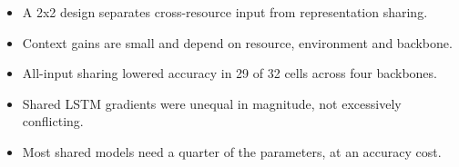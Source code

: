 \begin{itemize}
  \item A 2x2 design separates cross-resource input from representation sharing.
  \item Context gains are small and depend on resource, environment and backbone.
  \item All-input sharing lowered accuracy in 29 of 32 cells across four backbones.
  \item Shared LSTM gradients were unequal in magnitude, not excessively conflicting.
  \item Most shared models need a quarter of the parameters, at an accuracy cost.
\end{itemize}
